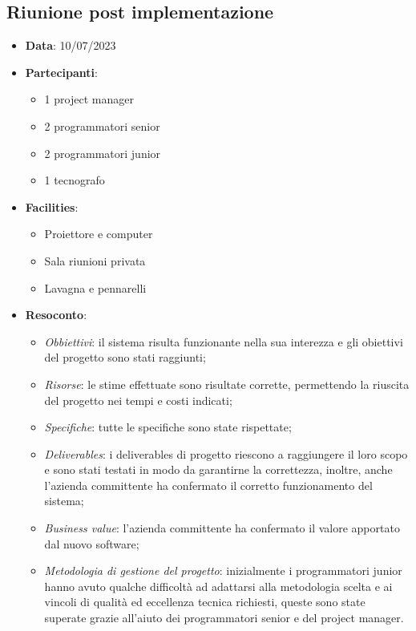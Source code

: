 \documentclass{article}
\begin{document}
  \subsection{Riunione post implementazione}
  \begin{itemize}
    \item \textbf{Data}: 10/07/2023
    \item \textbf{Partecipanti}: 
    \begin{itemize}
      \item 1 project manager
      \item 2 programmatori senior
      \item 2 programmatori junior
      \item 1 tecnografo
    \end{itemize}
    \item \textbf{Facilities}:
    \begin{itemize}
      \item Proiettore e computer
      \item Sala riunioni privata
      \item Lavagna e pennarelli
    \end{itemize}
    \item \textbf{Resoconto}:
    \begin{itemize}
      \item \emph{Obbiettivi}: 
        il sistema risulta funzionante nella sua interezza e gli obiettivi del progetto sono stati raggiunti;
      \item \emph{Risorse}:
        le stime effettuate sono risultate corrette, permettendo la riuscita del progetto nei tempi e costi indicati;
      \item \emph{Specifiche}:
        tutte le specifiche sono state rispettate;
      \item \emph{Deliverables}:
        i deliverables di progetto riescono a raggiungere il loro scopo e sono stati testati in modo da
        garantirne la correttezza, inoltre, anche l'azienda committente ha confermato il corretto 
        funzionamento del sistema;
      \item \emph{Business value}:
        l'azienda committente ha confermato il valore apportato dal nuovo software;
      \item \emph{Metodologia di gestione del progetto}:
        inizialmente i programmatori junior hanno avuto qualche difficoltà ad adattarsi alla metodologia scelta
        e ai vincoli di qualità ed eccellenza tecnica richiesti, queste sono state superate grazie all'aiuto
        dei programmatori senior e del project manager.
    \end{itemize}
  \end{itemize}
\end{document}
